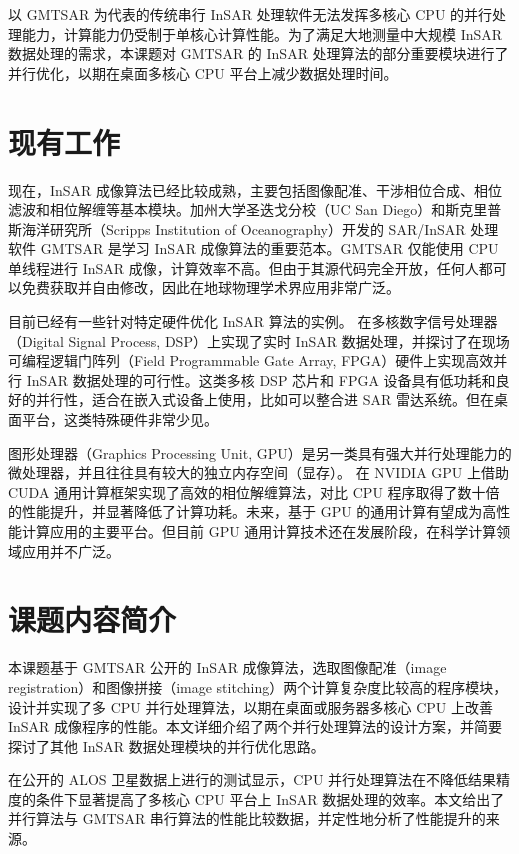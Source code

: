以 GMTSAR 为代表的传统串行 InSAR 处理软件无法发挥多核心 CPU 的并行处理能力，计算能力仍受制于单核心计算性能。为了满足大地测量中大规模 InSAR 数据处理的需求，本课题对 GMTSAR 的 InSAR 处理算法的部分重要模块进行了并行优化，以期在桌面多核心 CPU 平台上减少数据处理时间。

\section{现有工作}

现在，InSAR 成像算法已经比较成熟，主要包括图像配准、干涉相位合成、相位滤波和相位解缠等基本模块。加州大学圣迭戈分校（UC San Diego）和斯克里普斯海洋研究所（Scripps Institution of Oceanography）开发的 SAR/InSAR 处理软件 GMTSAR 是学习 InSAR 成像算法的重要范本。GMTSAR 仅能使用 CPU 单线程进行 InSAR 成像，计算效率不高。但由于其源代码完全开放，任何人都可以免费获取并自由修改，因此在地球物理学术界应用非常广泛。\cite{sandwell2011gmtsar}

目前已经有一些针对特定硬件优化 InSAR 算法的实例。\citet{shayu2014} 在多核数字信号处理器（Digital Signal Process, DSP）上实现了实时 InSAR 数据处理，并探讨了在现场可编程逻辑门阵列（Field Programmable Gate Array, FPGA）硬件上实现高效并行 InSAR 数据处理的可行性。这类多核 DSP 芯片和 FPGA 设备具有低功耗和良好的并行性，适合在嵌入式设备上使用，比如可以整合进 SAR 雷达系统。但在桌面平台，这类特殊硬件非常少见。

图形处理器（Graphics Processing Unit, GPU）是另一类具有强大并行处理能力的微处理器，并且往往具有较大的独立内存空间（显存）。\citet{reza2015accelerating} 在 NVIDIA GPU 上借助 CUDA 通用计算框架实现了高效的相位解缠算法，对比 CPU 程序取得了数十倍的性能提升，并显著降低了计算功耗。未来，基于 GPU 的通用计算有望成为高性能计算应用的主要平台。但目前 GPU 通用计算技术还在发展阶段，在科学计算领域应用并不广泛。

\section{课题内容简介}

本课题基于 GMTSAR 公开的 InSAR 成像算法，选取图像配准（image registration）和图像拼接（image stitching）两个计算复杂度比较高的程序模块，设计并实现了多 CPU 并行处理算法，以期在桌面或服务器多核心 CPU 上改善 InSAR 成像程序的性能。本文详细介绍了两个并行处理算法的设计方案，并简要探讨了其他 InSAR 数据处理模块的并行优化思路。

在公开的 ALOS 卫星数据上进行的测试显示，CPU 并行处理算法在不降低结果精度的条件下显著提高了多核心 CPU 平台上 InSAR 数据处理的效率。本文给出了并行算法与 GMTSAR 串行算法的性能比较数据，并定性地分析了性能提升的来源。

